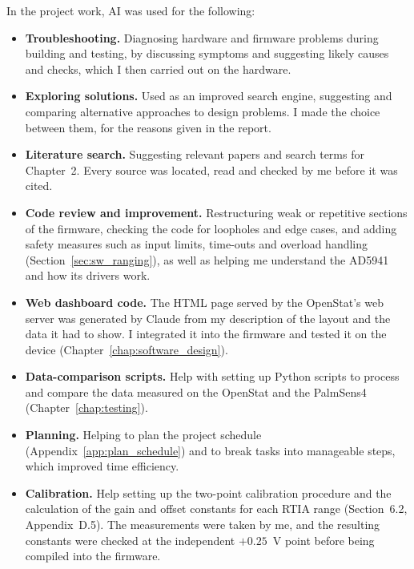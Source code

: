 In the project work, AI was used for the following:
\begin{itemize}[label=\textbullet]
  \item \textbf{Troubleshooting.} Diagnosing hardware and firmware problems
    during building and testing, by discussing symptoms and suggesting
    likely causes and checks, which I then carried out on the hardware.
  \item \textbf{Exploring solutions.} Used as an improved search engine,
    suggesting and comparing alternative approaches to design problems.
    I made the choice between them, for the reasons given in the report. 
  \item \textbf{Literature search.} Suggesting relevant papers and search terms for Chapter~2. Every source was located, read and checked by me before it was cited.
  \item \textbf{Code review and improvement.} Restructuring weak or
    repetitive sections of the firmware, checking the code for loopholes
    and edge cases, and adding safety measures such as input limits,
    time-outs and overload handling (Section~\ref{sec:sw_ranging}), as
    well as helping me understand the AD5941 and how its drivers work.
  \item \textbf{Web dashboard code.} The HTML page served by the
    OpenStat's web server was generated by Claude from my description of
    the layout and the data it had to show. I integrated it into the
    firmware and tested it on the device
    (Chapter~\ref{chap:software_design}).
  \item \textbf{Data-comparison scripts.} Help with setting up Python
    scripts to process and compare the data measured on the OpenStat and
    the PalmSens4 (Chapter~\ref{chap:testing}).
  \item \textbf{Planning.} Helping to plan the project schedule
    (Appendix~\ref{app:plan_schedule}) and to break tasks into manageable
    steps, which improved time efficiency.
  \item \textbf{Calibration.} Help setting up the two-point calibration procedure and the calculation of the gain and offset constants for each RTIA range (Section~6.2, Appendix~D.5). The measurements were taken by me, and the resulting constants were checked at the independent $+0.25$~V point before being compiled into the firmware.
\end{itemize}

